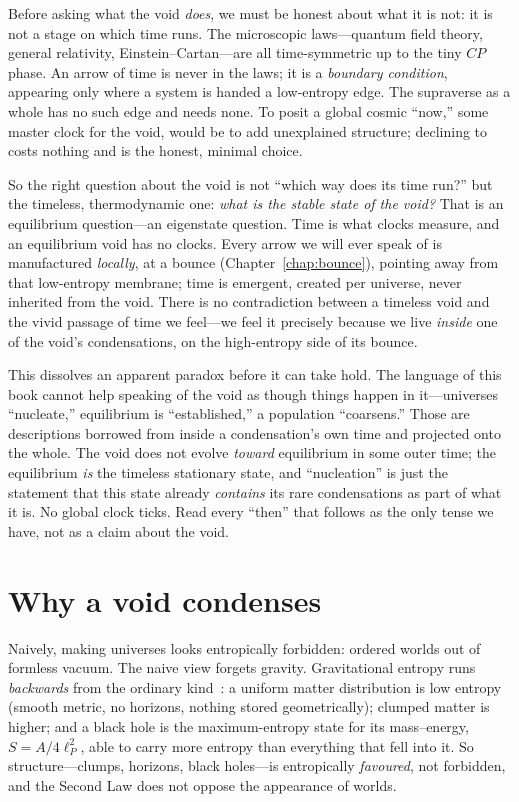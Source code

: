 Before asking what the void \emph{does}, we must be honest about what it is not:
it is not a stage on which time runs. The microscopic laws---quantum field
theory, general relativity, Einstein--Cartan---are all time-symmetric up to the
tiny $CP$ phase. An arrow of time is never in the laws; it is a \emph{boundary
condition}, appearing only where a system is handed a low-entropy edge. The
supraverse as a whole has no such edge and needs none. To posit a global cosmic
``now,'' some master clock for the void, would be to add unexplained structure;
declining to costs nothing and is the honest, minimal choice.

So the right question about the void is not ``which way does its time run?'' but
the timeless, thermodynamic one: \emph{what is the stable state of the void?} That
is an equilibrium question---an eigenstate question. Time is what clocks measure,
and an equilibrium void has no clocks. Every arrow we will ever speak of is
manufactured \emph{locally}, at a bounce (Chapter~\ref{chap:bounce}), pointing
away from that low-entropy membrane; time is emergent, created per universe, never
inherited from the void. There is no contradiction between a timeless void and the
vivid passage of time we feel---we feel it precisely because we live \emph{inside}
one of the void's condensations, on the high-entropy side of its bounce.

This dissolves an apparent paradox before it can take hold. The language of this
book cannot help speaking of the void as though things happen in it---universes
``nucleate,'' equilibrium is ``established,'' a population ``coarsens.'' Those are
descriptions borrowed from inside a condensation's own time and projected onto the
whole. The void does not evolve \emph{toward} equilibrium in some outer time; the
equilibrium \emph{is} the timeless stationary state, and ``nucleation'' is just
the statement that this state already \emph{contains} its rare condensations as
part of what it is. No global clock ticks. Read every ``then'' that follows as the
only tense we have, not as a claim about the void.

\section{Why a void condenses}

Naively, making universes looks entropically forbidden: ordered worlds out of
formless vacuum. The naive view forgets gravity. Gravitational entropy runs
\emph{backwards} from the ordinary kind~\citep{penrose1979,bekenstein1973}: a
uniform matter distribution is low entropy (smooth metric, no horizons, nothing
stored geometrically); clumped matter is higher; and a black hole is the
maximum-entropy state for its mass--energy, $S=A/4\ell_P^2$, able to carry more
entropy than everything that fell into it. So structure---clumps, horizons, black
holes---is entropically \emph{favoured}, not forbidden, and the Second Law does
not oppose the appearance of worlds.

